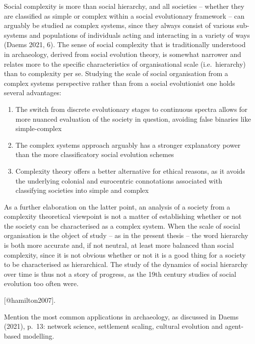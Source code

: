 \documentclass[
  12pt,
  a4paper, twoside]{book}
\begin{document}
Social complexity is more than social hierarchy, and all societies -- whether they are classified as simple or complex within a social evolutionary framework -- can arguably be studied as complex systems, since they always consist of various sub-systems and populations of individuals acting and interacting in a variety of ways (Daems 2021, 6). The sense of social complexity that is traditionally understood in archaeology, derived from social evolution theory, is somewhat narrower and relates more to the specific characteristics of organisational scale (i.e.~hierarchy) than to complexity per se. Studying the scale of social organisation from a complex systems perspective rather than from a social evolutionist one holds several advantages:

\begin{enumerate}
\def\labelenumi{\arabic{enumi}.}
\item
  The switch from discrete evolutionary stages to continuous spectra allows for more nuanced evaluation of the society in question, avoiding false binaries like simple-complex
\item
  The complex systems approach arguably has a stronger explanatory power than the more classificatory social evolution schemes
\item
  Complexity theory offers a better alternative for ethical reasons, as it avoids the underlying colonial and eurocentric connotations associated with classifying societies into simple and complex
\end{enumerate}

As a further elaboration on the latter point, an analysis of a society from a complexity theoretical viewpoint is not a matter of establishing whether or not the society can be characterised as a complex system. When the scale of social organisation is the object of study -- as in the present thesis -- the word hierarchy is both more accurate and, if not neutral, at least more balanced than social complexity, since it is not obvious whether or not it is a good thing for a society to be characterised as hierarchical. The study of the dynamics of social hierarchy over time is thus not a story of progress, as the 19th century studies of social evolution too often were.

{[}@hamilton2007{]}.

Mention the most common applications in archaeology, as discussed in Daems (2021), p.~13: network science, settlement scaling, cultural evolution and agent-based modelling.
\end{document}
